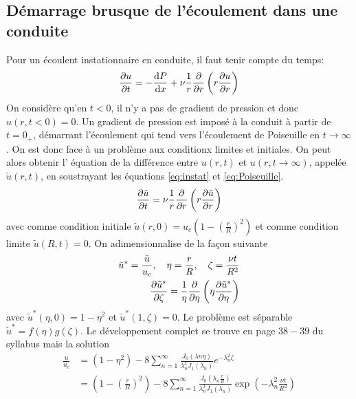     \subsection{Démarrage brusque de l'écoulement dans une conduite}
      Pour un écoulent instationnaire en conduite, il faut tenir compte du temps:
      \begin{equation}
        \pdv{u}{t} = -\dv{P}{x} + \nu \frac{1}{r} \pdv{r} \left(r\pdv{u}{r}\right) \label{eq:instat}
      \end{equation}
      On considère qu'en $t<0$, il n'y a pas de gradient de pression et donc $u(r, t<0) = 0$. Un gradient de pression est imposé à la conduit à partir de $t=0_+$, démarrant l'écoulement qui tend vers l'écoulement de Poiseuille en $t \rightarrow \infty$. On est donc face à un problème aux conditionx limites et initiales. On peut alors obtenir l' équation de la différence entre $u(r, t)$ et $u(r, t\rightarrow\infty)$, appelée $\tilde{u}(r,t)$, en soustrayant les équations \ref{eq:instat} et \ref{eq:Poiseuille}.
      \begin{equation}
        \pdv{\tilde{u}}{t} = \nu \frac{1}{r} \pdv{r} \left(r\pdv{\tilde{u}}{r}\right)
      \end{equation}
      avec comme condition initiale $\tilde{u}(r,0)=u_c\left(1-\left(\frac{r}{R}\right)^2\right)$ et comme condition limite $\tilde{u}(R,t)=0$. On adimensionnalise de la façon suivante
      \begin{equation}
        \begin{aligned}
          \tilde{u}^\ast = \frac{\tilde{u}}{u_c}, \quad \eta = \frac{r}{R}, \quad \zeta = \frac{\nu t}{R^2}\\
          \pdv{\tilde{u}^\ast}{\zeta} = \frac{1}{\eta}\pdv{\eta}\left(\eta\pdv{\tilde{u}^\ast}{\eta}\right)
        \end{aligned}
      \end{equation}
      avec $\tilde{u}^\ast(\eta,0) = 1-\eta^2$ et $\tilde{u}^\ast(1, \zeta) = 0$. Le problème est séparable $\tilde{u}^\ast = f(\eta)g(\zeta)$. Le développement complet se trouve en page $38-39$ du syllabus mais la solution
      \begin{equation}
        \begin{aligned}
          \frac{u}{u_c} &= (1-\eta^2) - 8 \sum^\infty_{n=1} \frac{J_0(\lambda{n}\eta)}{\lambda_n^3 J_1(\lambda_n)}e^{-\lambda_n^2 \zeta}\\
          &= \left(1- \left(\frac{r}{R}\right)^2\right) - 8 \sum^\infty_{n=1} \frac{J_0\left(\lambda_n \frac{r}{R}\right)}{\lambda_n^3 J_1(\lambda_n)} \exp(-\lambda_n^2 \frac{\nu t}{R^2})
        \end{aligned}
      \end{equation}
